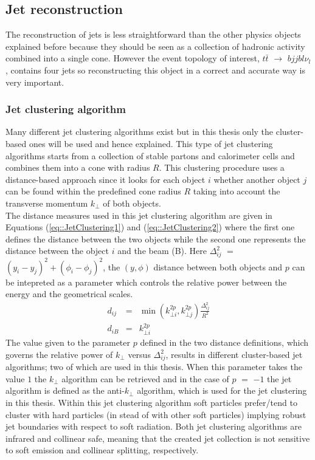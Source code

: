 \subsection{Jet reconstruction}
The reconstruction of jets is less straightforward than the other physics objects explained before because they should be seen as a collection of hadronic activity combined into a single cone. However the event topology of interest, $t\bar{t}$ $\rightarrow$ $bjjbl\nu_{l}$, contains four jets so reconstructing this object in a correct and accurate way is very important.

 
\subsubsection*{Jet clustering algorithm}
Many different jet clustering algorithms exist but in this thesis only the cluster-based ones will be used and hence explained. This type of jet clustering algorithms starts from a collection of stable partons and calorimeter cells and combines them into a cone with radius $R$. This clustering procedure uses a distance-based approach since it looks for each object $i$ whether another object $j$ can be found within the predefined cone radius $R$ taking into account the transverse momentum $k_{\bot}$ of both objects.
\\
The distance measures used in this jet clustering algorithm are given in Equations (\ref{eq::JetClustering1}) and (\ref{eq::JetClustering2}) where the first one defines the distance between the two objects while the second one represents the distance between the object $i$ and the beam (B). Here $\Delta_{ij}^{2}$ $=$ $(y_i - y_j)^{2} + (\phi_i - \phi_j)^2$, the $(y,\phi)$ distance between both objects and $p$ can be intepreted as a parameter which controls the relative power between the energy and the geometrical scales.
\\
\begin{eqnarray}
 d_{ij} & = & \min(k_{\bot i}^{2p}, k_{\bot j}^{2p}) \frac{\Delta_{ij}^{2}}{R^{2}} \label{eq::JetClustering1} \\
 d_{iB} & = & k_{\bot i}^{2p}                                                      \label{eq::JetClustering2}
\end{eqnarray}
The value given to the parameter $p$ defined in the two distance definitions, which governs the relative power of $k_{\bot}$ versus $\Delta_{ij}^{2}$, results in different cluster-based jet algorithms; two of which are used in this thesis. When this parameter takes the value $1$ the $k_{\bot}$ algorithm can be retrieved and in the case of $p$ $=$ $-1$ the jet algorithm is defined as the anti-$k_{\bot}$ algorithm, which is used for the jet clustering in this thesis. %
Within this jet clustering algorithm soft particles prefer/tend to cluster with hard particles (in stead of with other soft particles) implying robust jet boundaries with respect to soft radiation. Both jet clustering algorithms are infrared and collinear safe, meaning that the created jet collection is not sensitive to soft emission and collinear splitting, respectively.
\\

